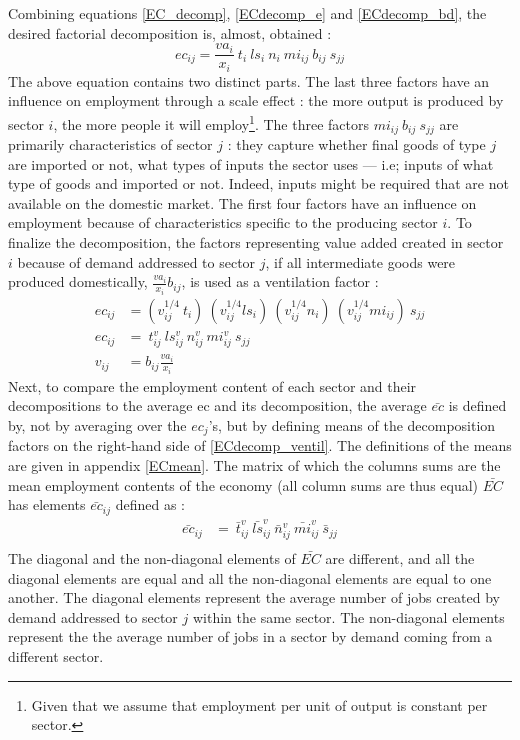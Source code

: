 \documentclass[12pt,english]{article}
\begin{document}
Combining equations \ref{EC_decomp}, \ref{ECdecomp_e} and \ref{ECdecomp_bd}, the desired factorial decomposition is, almost, obtained :
\begin{equation}
ec_{ij} = \frac{va_i}{x_i} \ t_i \ ls_i \ n_i \ mi_{ij} \ b_{ij} \ s_{jj}
\end{equation}
The above equation contains two distinct parts. The last three factors %
have an influence on employment through a scale effect : the more output is produced by sector $i$, the more people it will employ\footnote{Given that we assume that employment per unit of output is constant per sector.}. The three factors $mi_{ij} \ b_{ij} \ s_{jj}$ are primarily characteristics of sector $j$ : they capture whether final goods of type $j$ are imported or not, what types of inputs the sector uses --- i.e; inputs of what type of goods and imported or not. Indeed, inputs might be required that are not available on the domestic market. The first four factors have an influence on employment because of characteristics specific to the producing sector $i$. To finalize the decomposition, the factors representing value added created in sector $i$ because of demand addressed to sector $j$, if all intermediate goods were produced domestically, $\frac{va_i}{x_i} b_{ij}$, is used as a ventilation factor :
\begin{align}
ec_{ij} &= (v_{ij}^{1/4} \ t_i) \ (v_{ij}^{1/4}ls_i) \ (v_{ij}^{1/4}n_i) \ (v_{ij}^{1/4}mi_{ij})  \ s_{jj}  \\
ec_{ij} &=  \ t^v_{ij} \ ls^v_{ij} \ n^v_{ij} \ mi^v_{ij}  \ s_{jj} \label{ECdecomp_ventil} \\
v_{ij} &= b_{ij} \frac{va_i}{x_i} 
\end{align}
Next, to compare the employment content of each sector and their decompositions to the average ec and its decomposition, the average $\bar{ec}$ is defined by, not by averaging over the $ec_j$'s, but by defining means of the decomposition factors on the right-hand side of 
\ref{ECdecomp_ventil}. The definitions of the means are given in appendix \ref{ECmean}. The matrix of which the columns sums are the mean employment contents of the economy (all column sums are thus equal) $\bar{EC}$ has elements $\bar{ec}_{ij}$ defined as : 
\begin{align}
\bar{ec}_{ij} &=  \ \bar{t}^v_{ij} \ \bar{ls}^v_{ij} \ \bar{n}^v_{ij} \ \bar{mi}^v_{ij}  \ \bar{s}_{jj} \label{ECdecomp_ventil_mean} \\
\end{align}
The diagonal and the non-diagonal elements of $\bar{EC}$ are different, and all the diagonal elements are equal and all the non-diagonal elements are equal to one another. The diagonal elements represent the average number of jobs created by demand addressed to sector $j$ within the same sector. The non-diagonal elements represent the the average number of jobs in a sector by demand coming from a different sector. 
\end{document}
